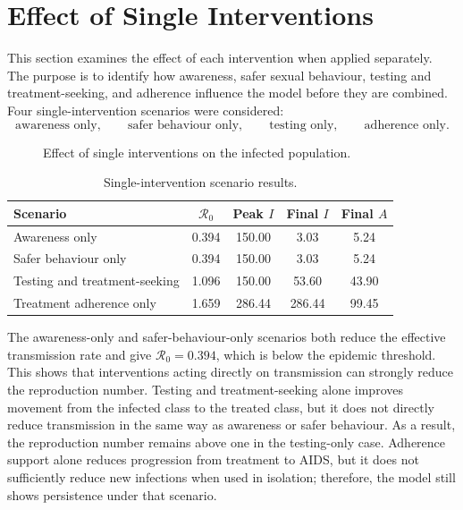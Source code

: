 \documentclass[12pt,a4paper,oneside]{report}
\begin{document}
\section{Effect of Single Interventions}
This section examines the effect of each intervention when applied separately. The purpose is to identify how awareness, safer sexual behaviour, testing and treatment-seeking, and adherence influence the model before they are combined. Four single-intervention scenarios were considered:
\[
\text{awareness only},\qquad
\text{safer behaviour only},\qquad
\text{testing only},\qquad
\text{adherence only}.
\]

\begin{figure}[H]
\centering
{}
\caption{Effect of single interventions on the infected population.}
\label{fig:single_interventions_infected}
\end{figure}

\begin{table}[H]
\centering
\caption{Single-intervention scenario results.}
\label{tab:single_interventions}
\begin{tabular}{lcccc}
\toprule
Scenario & $\mathcal{R}_0$ & Peak $I$ & Final $I$ & Final $A$\\
\midrule
Awareness only & 0.394 & 150.00 & 3.03 & 5.24\\
Safer behaviour only & 0.394 & 150.00 & 3.03 & 5.24\\
Testing and treatment-seeking & 1.096 & 150.00 & 53.60 & 43.90\\
Treatment adherence only & 1.659 & 286.44 & 286.44 & 99.45\\
\bottomrule
\end{tabular}
\end{table}

The awareness-only and safer-behaviour-only scenarios both reduce the effective transmission rate and give $\mathcal{R}_0=0.394$, which is below the epidemic threshold. This shows that interventions acting directly on transmission can strongly reduce the reproduction number. Testing and treatment-seeking alone improves movement from the infected class to the treated class, but it does not directly reduce transmission in the same way as awareness or safer behaviour. As a result, the reproduction number remains above one in the testing-only case. Adherence support alone reduces progression from treatment to AIDS, but it does not sufficiently reduce new infections when used in isolation; therefore, the model still shows persistence under that scenario.
\end{document}
